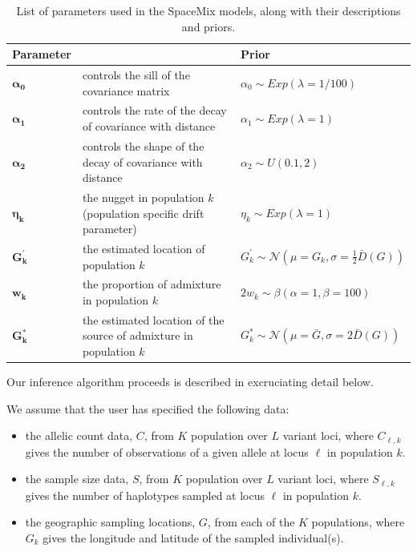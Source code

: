 \documentclass[12pt]{article}
\newcommand{\identifyadmixsource}[1]{{#1^{*}}}
\begin{document}
\begin{centering}
\begin{table}
\begin{tabular}{| >{\centering\arraybackslash}m{2.1cm} | m{6cm} | >{\centering\arraybackslash}m{6cm} |}
	\hline
	\textbf{Parameter} & \centering{\textbf{Description}} & \textbf{Prior}\\ \hline
	$\boldsymbol{\alpha_0}$ & 
		controls the sill of the covariance matrix & 
		$\alpha_0 \sim Exp(\lambda = 1/100)$\\ \hline
	$\boldsymbol{\alpha_1}$ & 
		controls the rate of the decay of covariance with distance & 
		$\alpha_1 \sim Exp(\lambda = 1)$\\ \hline
	$\boldsymbol{\alpha_2}$ & 
		controls the shape of the decay of covariance with distance & 
		$\alpha_2 \sim U(0.1,2)$\\ \hline
	$\boldsymbol{\eta_k}$ & 
		the nugget in population $k$ (population specific drift parameter)  & 
		$\eta_k \sim Exp(\lambda = 1)$\\ \hline
	$\boldsymbol{G_k^{\prime}}$ & 
		the estimated location of population $k$ &
		 $G_k^{\prime} \sim \mathcal{N}(\mu = G_k,\sigma = \frac{1}{2}\bar{D}(G))$ \\ \hline
	$\boldsymbol{w_k}$ &
		the proportion of admixture in population $k$ &
		$2 w_k \sim \beta(\alpha = 1,\beta = 100)$  \\ \hline
	$\boldsymbol{\identifyadmixsource{G_k}}$ &
		the estimated location of the source of admixture in population $k$ &
		$\identifyadmixsource{G_k} \sim \mathcal{N}(\mu = \bar{G},\sigma = 2 \bar{D}(G))$ \\
	\hline
\end{tabular}
\caption{List of parameters used in the SpaceMix models, along with their descriptions and priors.}\label{tab:param_prior_tab}
\end{table}
\end{centering}

Our inference algorithm proceeds is described in excruciating detail below.

We assume that the user has specified the following data: 
\begin{itemize}
\item the allelic count data, $C$, from $K$ population over $L$ variant loci, where $C_{\ell,k}$ gives the number of observations of a given allele at locus $\ell$ in population $k$. 
\item the sample size data, $S$, from $K$ population over $L$ variant loci, where $S_{\ell,k}$ gives the number of haplotypes sampled at locus $\ell$ in population $k$.
\item the geographic sampling locations, $G$, from each of the $K$ populations, where $G_k$ gives the longitude and latitude of the sampled individual(s).
\end{itemize}
\end{document}
